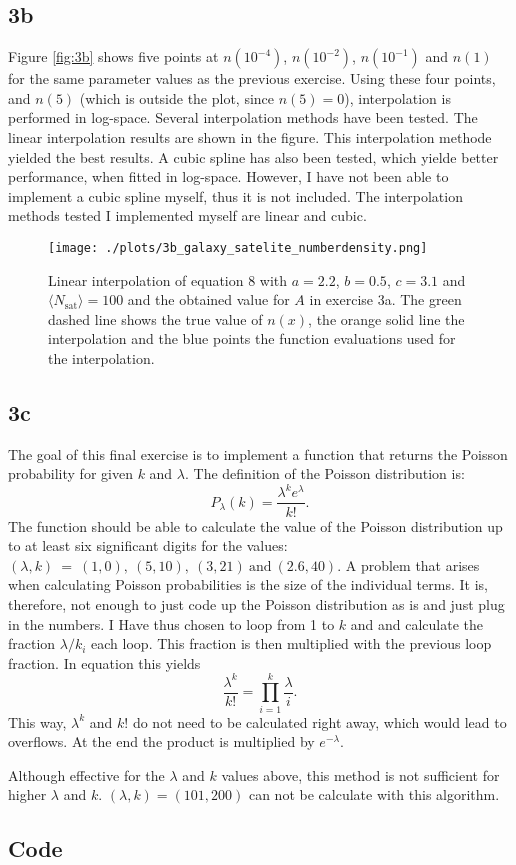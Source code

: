 \subsection*{3b}
Figure \ref{fig:3b} shows five points at $n(10^{−4})$, $n(10^{−2})$, $n(10^{−1})$ and $n(1)$ for the same parameter values as the previous exercise. Using these four points, and $n(5)$ (which is outside the plot, since $n(5)=0$), interpolation is performed in log-space. Several interpolation methods have been tested. The linear interpolation results are shown in the figure. This interpolation methode yielded the best results. A cubic spline has also been tested, which yielde better performance, when fitted in log-space. However, I have not been able to implement a cubic spline myself, thus it is not included. The interpolation methods tested I implemented myself are linear and cubic.

\begin{figure}[h!]
  \centering
  \texttt{[image: ./plots/3b\_galaxy\_satelite\_numberdensity.png]}
  \caption{Linear interpolation of equation 8 with $a = 2.2$, $b = 0.5$, $c = 3.1$ and $\langle N_\mathrm{sat}\rangle = 100$ and the obtained value for $A$ in exercise 3a. The green dashed line shows the true value of $n(x)$, the orange solid line the interpolation and the blue points the function evaluations used for the interpolation.}
  \label{fig:3a}
\end{figure}

\subsection*{3c}
The goal of this final exercise is to implement a function that returns the Poisson probability for given $k$ and $\lambda$. The definition of the Poisson distribution is:
\begin{equation}
  P_\lambda(k)=\frac{\lambda^k e^{\lambda}}{k!}.
\end{equation}
The function should be able to calculate the value of the Poisson distribution up to at least six significant digits for the values: $(\lambda, k)\ =\ (1, 0),\ (5, 10),\ (3, 21)\ \mathrm{and}\ (2.6, 40)$. A problem that arises when calculating Poisson probabilities is the size of the individual terms. It is, therefore, not enough to just code up the Poisson distribution as is and just plug in the numbers. I Have thus chosen to loop from 1 to $k$ and and calculate the fraction $\lambda / k_i$ each loop. This fraction is then multiplied with the previous loop fraction. In equation this yields
\begin{equation}
  \frac{\lambda^k}{k!} = \prod_{i=1}^k \frac{\lambda}{i}.
\end{equation}
This way, $\lambda^k$ and $k!$ do not need to be calculated right away, which would lead to overflows. At the end the product is multiplied by $e^{-\lambda}$.

Although effective for the $\lambda$ and $k$ values above, this method is not sufficient for higher $\lambda$ and $k$. $(\lambda, k) = (101, 200)$ can not be calculate with this algorithm.

\pagebreak

\subsection*{Code}


\newpage